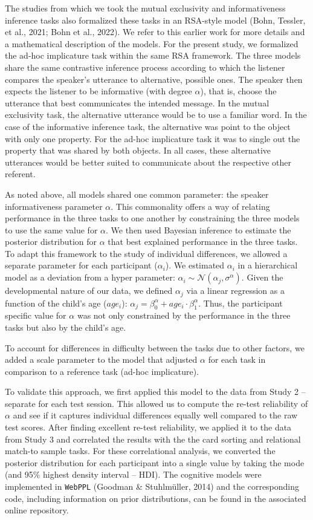 \documentclass[
  man,floatsintext]{apa6}
\begin{document}
The studies from which we took the mutual exclusivity and informativeness inference tasks also formalized these tasks in an RSA-style model (Bohn, Tessler, et al., 2021; Bohn et al., 2022). We refer to this earlier work for more details and a mathematical description of the models. For the present study, we formalized the ad-hoc implicature task within the same RSA framework. The three models share the same contrastive inference process according to which the listener compares the speaker's utterance to alternative, possible ones. The speaker then expects the listener to be informative (with degree \(\alpha\)), that is, choose the utterance that best communicates the intended message. In the mutual exclusivity task, the alternative utterance would be to use a familiar word. In the case of the informative inference task, the alternative was point to the object with only one property. For the ad-hoc implicature task it was to single out the property that was shared by both objects. In all cases, these alternative utterances would be better suited to communicate about the respective other referent.

As noted above, all models shared one common parameter: the speaker informativeness parameter \(\alpha\). This commonality offers a way of relating performance in the three tasks to one another by constraining the three models to use the same value for \(\alpha\). We then used Bayesian inference to estimate the posterior distribution for \(\alpha\) that best explained performance in the three tasks. To adapt this framework to the study of individual differences, we allowed a separate parameter for each participant (\(\alpha_i\)). We estimated \(\alpha_i\) in a hierarchical model as a deviation from a hyper parameter: \(\alpha_i \sim \mathcal{N}(\alpha_j, \sigma^\alpha)\). Given the developmental nature of our data, we defined \(\alpha_j\) via a linear regression as a function of the child's age (\(age_i\)): \(\alpha_j = \beta^\alpha_0 + age_i \cdot \beta^\alpha_1\). Thus, the participant specific value for \(\alpha\) was not only constrained by the performance in the three tasks but also by the child's age.

To account for differences in difficulty between the tasks due to other factors, we added a scale parameter to the model that adjusted \(\alpha\) for each task in comparison to a reference task (ad-hoc implicature).

To validate this approach, we first applied this model to the data from Study 2 -- separate for each test session. This allowed us to compute the re-test reliability of \(\alpha\) and see if it captures individual differences equally well compared to the raw test scores. After finding excellent re-test reliability, we applied it to the data from Study 3 and correlated the results with the the card sorting and relational match-to sample tasks. For these correlational analysis, we converted the posterior distribution for each participant into a single value by taking the mode (and 95\% highest density interval -- HDI). The cognitive models were implemented in \texttt{WebPPL} (Goodman \& Stuhlmüller, 2014) and the corresponding code, including information on prior distributions, can be found in the associated online repository.
\end{document}
